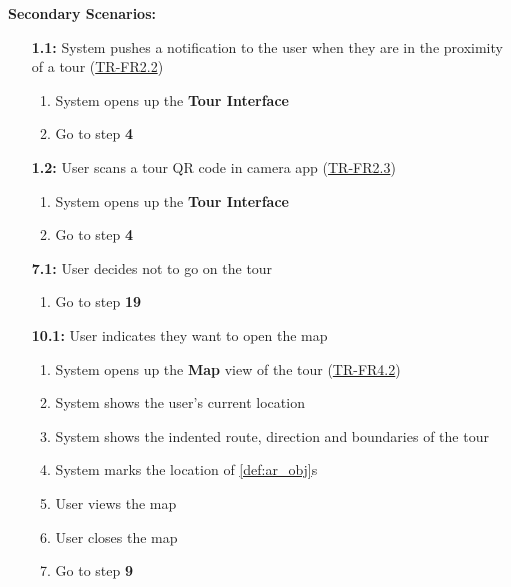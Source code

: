 \documentclass{article}
\begin{document}
\begin{enumerate}[label=\textbf{UC\arabic*}]
          \textbf{Secondary Scenarios:}
          \begin{itemize}
              \item[{\bf 1.1:}] System pushes a notification to the user when they are in the proximity of a tour (\hyperref[ssub:touring]{TR-FR2.2})
                  \begin{enumerate}[label=\textbf{\arabic*.}]
                      \item System opens up the \textbf{Tour Interface}
                      \item Go to step \textbf{4}
                  \end{enumerate}
              \item[{\bf 1.2:}] User scans a tour QR code in camera app (\hyperref[ssub:touring]{TR-FR2.3})
                  \begin{enumerate}[label=\textbf{\arabic*.}]
                      \item System opens up the \textbf{Tour Interface}
                      \item Go to step \textbf{4}
                  \end{enumerate}
              \item[{\bf 7.1:}] User decides not to go on the tour
                  \begin{enumerate}[label=\textbf{\arabic*.}]
                      \item Go to step \textbf{19}
                  \end{enumerate}
              \item[{\bf 10.1:}] User indicates they want to open the map
                  \begin{enumerate}[label=\textbf{\arabic*.}]
                      \item System opens up the \textbf{Map} view of the tour (\hyperref[ssub:touring]{TR-FR4.2})
                      \item System shows the user’s current location
                      \item System shows the indented route, direction and boundaries of the tour
                      \item System marks the location of \ref{def:ar_obj}s
                      \item User views the map
                      \item User closes the map
                      \item Go to step \textbf{9}
                  \end{enumerate}

\end{itemize}
\end{enumerate}
\end{document}
